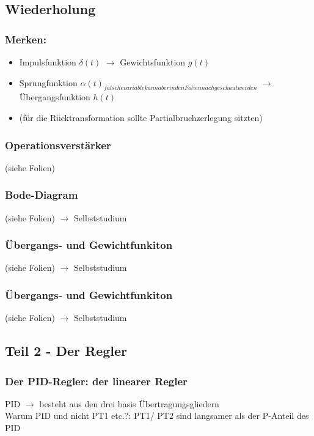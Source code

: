 \documentclass{article}
\begin{document}
\subsection*{Wiederholung}
\subsubsection*{Merken:}
\begin{itemize}
	\item Impulsfunktion $\delta (t)$ $\rightarrow$ Gewichtsfunktion $g(t)$
	\item Sprungfunktion $\alpha (t) _{falsche variable kann aber in den Folien nachgeschaut werden}$ $\rightarrow$ Übergangsfunktion $h(t)$
	\item (für die Rücktransformation sollte Partialbruchzerlegung sitzten)
\end{itemize}

\subsubsection*{Operationsverstärker}
(siehe Folien)

\subsubsection*{Bode-Diagram}
(siehe Folien) $\rightarrow$ Selbststudium

\subsubsection*{Übergangs- und Gewichtfunkiton}
(siehe Folien) $\rightarrow$ Selbststudium

\subsubsection*{Übergangs- und Gewichtfunkiton}
(siehe Folien) $\rightarrow$ Selbststudium

\newpage
\subsection*{Teil 2 - Der Regler}
\subsubsection*{Der PID-Regler: der linearer Regler}
PID $\rightarrow$ besteht aus den drei basis Übertragungsgliedern \\
Warum PID und nicht PT1 etc.?: PT1/ PT2 sind langsamer als der P-Anteil des PID \\
\end{document}
